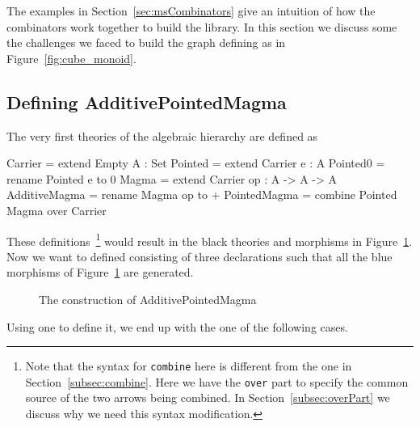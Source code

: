 The examples in Section~\ref{sec:msCombinators} give an intuition of how the combinators work together to build the library. In this section we discuss some the challenges we faced to build the graph defining  as in Figure~\ref{fig:cube_monoid}.  

\subsection{Defining AdditivePointedMagma}
The very first theories of the algebraic hierarchy are defined as 
\begin{togcode} 
Carrier = extend Empty {A : Set}
Pointed = extend Carrier {e : A}
Pointed0 = rename Pointed {e to 0} 
Magma = extend Carrier {op : A -> A -> A}
AdditiveMagma = rename Magma {op to +} 
PointedMagma = combine Pointed {} Magma {} over Carrier
\end{togcode} 
These definitions~\footnote{Note that the syntax for \texttt{combine} here is different from the one in Section~\ref{subsec:combine}. Here we have the \texttt{over} part to specify the common source of the two arrows being combined. In Section~\ref{subsec:overPart} we discuss why we need this syntax modification.} would result in the black theories and morphisms in Figure~\ref{fig:addPointedMagma}. Now we want to defined  consisting of three declarations  such that all the blue morphisms of 
Figure~\ref{fig:addPointedMagma} are generated. 
\begin{figure}[h]
    \caption{The construction of AdditivePointedMagma}
    \label{fig:addPointedMagma}
\end{figure}
Using one  to define it, we end up with the one of the following cases. 
